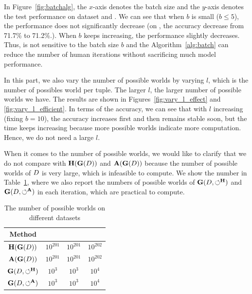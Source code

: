 In Figure~\ref{fig:batchalg}, the $x$-axis denotes the batch size and the $y$-axis denotes the test performance on dataset \adult and  \bike. We can see that when $b$ is small (\ie $b \le 5$), the performance does not significantly decrease (\eg on \adult, the accuracy decrease from 71.7\% to 71.2\%.).  When $b$ keeps increasing, the performance slightly decreases. Thus, \ours is not  sensitive to the batch size $b$ and the Algorithm~\ref{alg:batch} can reduce the number of human iterations without sacrificing much  model performance.


In this part, we also vary the number of possible worlds by varying $l$, which is the number of possibles world per tuple. The larger $l$, the larger number of possible worlds we have. The results are shown in Figures~\ref{fig:vary_l_effect} and  \ref{fig:vary_l_efficient}. In terms of the accuracy, we can see that with $l$ increasing (fixing $b=10$), the accuracy increases first and then  remains stable soon, but the time keeps increasing because more possible worlds indicate more computation. Hence, we do not need a large $l$.

When it comes to the number of possible worlds, we would like to clarify that we do not compare with $\mathbf{H}(\mathbf{G}(D))$ and $\mathbf{A}(\mathbf{G}(D))$ because  the number of  possible worlds of $D$ is very large, which is infeasible to compute. We show the number in Table~\ref{tbl:pwnum}, where we also report the numbers of possible worlds of $\mathbf{G}(D,\circlearrowleft^\mathbf{H})$ and $\mathbf{G}(D,\circlearrowleft^\mathbf{A})$ in each iteration, which are practical to compute.


\begin{table}
	\centering
	\caption{The number of possible worlds on different datasets}
	{\small
		\begin{tabular}{cccc}
			\hline
			{\bf Method} & {\bf \nursery} & {\bf \hr} & {\bf \adult} \\
			\hline	
			$\mathbf{H}(\mathbf{G}(D))$ & $10^{201}$ & $10^{201}$ & $10^{202}$ \\
			$\mathbf{A}(\mathbf{G}(D))$ & $10^{201}$ & $10^{201}$ & $10^{202}$ \\
			$\mathbf{G}(D,\circlearrowleft^\mathbf{H})$ & $10^3$ & $10^3$ & $10^4$ \\
			$\mathbf{G}(D,\circlearrowleft^\mathbf{A})$ & $10^3$ & $10^3$ & $10^4$ \\
			\hline
		\end{tabular}
	}
	\label{tbl:pwnum}
	\vspace{-1em}
\end{table}

